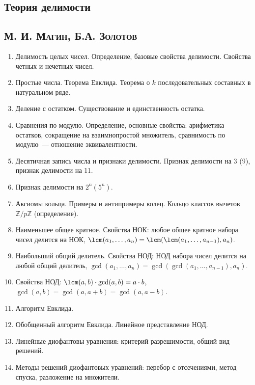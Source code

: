 \documentclass[11pt]{article}
\begin{document}
\begin{center}
    \section*{Теория делимости}
    \subsection*{\textsc{М. И. Магин, Б.А. Золотов}}
\end{center}

\begin{enumerate}
    \item Делимость целых чисел. Определение, базовые свойства делимости. Свойства четных и нечетных чисел.
    \item Простые числа. Теорема Евклида. Теорема о $k$ последовательных составных в натуральном ряде.
    \item Деление с остатком. Существование и единственность остатка.
    \item Сравнения по модулю. Определение, основные свойства: арифметика остатков, сокращение на взаимнопростой множитель, сравнимость по модулю~--- отношение эквивалентности.
    \item Десятичная запись числа и признаки делимости. Признак делимости на 3 (9), признак делимости на 11.
    \item Признак делимости на $2^n (5^n)$.
    \item Аксиомы кольца. Примеры и антипримеры колец. Кольцо классов вычетов $\mathbb{Z}/p\mathbb{Z}$ (определение).
    \item Наименьшее общее кратное. Свойства НОК: любое общее кратное набора чисел делится на НОК, $\lcm(a_1, \ldots, a_n) = \lcm(\lcm(a_1, \ldots, a_{n - 1}), a_n)$.
    \item Наибольший общий делитель. Свойства НОД: НОД набора чисел делится на любой общий делитель, $\gcd(a_1, \ldots, a_n) = \gcd(\gcd(a_1, \ldots, a_{n - 1}), a_n)$.
    \item Свойства НОД: $\lcm(a, b) \cdot \gcd(a, b) = a \cdot b$, $\gcd(a, b) = \gcd(a, a + b) = \gcd(a, a - b)$.
    \item Алгоритм Евклида.
    \item Обобщенный алгоритм Евклида. Линейное представление НОД.
    \item Линейные диофантовы уравнения: критерий разрешимости, общий вид решений.
    \item Методы решений диофантовых уравнений: перебор с отсечениями, метод спуска, разложение на множители.

\end{enumerate}
\end{document}
